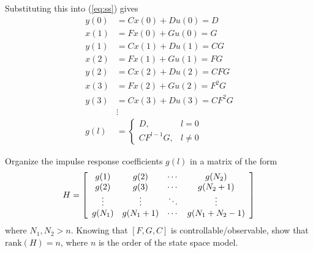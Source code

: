 \documentclass{report} %
\begin{document}
\begin{spacing}{1.1}
\begin{homeworkProblem}
\begin{homeworkSection}{1.1}
{Substituting this into (\ref{eq:ss}) gives
\begin{align*}
y(0) &= Cx(0) + Du(0) = D \\
x(1) &= Fx(0) + Gu(0) = G \\
y(1) &= Cx(1) + Du(1) = CG \\
x(2) &= Fx(1) + Gu(1) = FG \\
y(2) &= Cx(2) + Du(2) = CFG \\
x(3) &= Fx(2) + Gu(2) = F^2G \\
y(3) &= Cx(3) + Du(3) = CF^2G \\
&\vdots \\
g(l) &= \begin{cases} D, & l=0 \\ CF^{l-1}G, & l\neq 0 \end{cases}
\end{align*}
}
\end{homeworkSection}

\begin{homeworkSection}{1.2}
Organize the impulse response coefficients $g(l)$ in a matrix of the form
\begin{align*}
H =
\left[\begin{array}{c c c c}
g(1) & g(2) & \cdots & g(N_2) \\
g(2) & g(3) & \cdots & g(N_2+1) \\
\vdots & \vdots & \ddots & \vdots \\
g(N_1) & g(N_1+1) & \cdots & g(N_1+N_2-1)
\end{array}\right]
\end{align*}
where $N_1,N_2>n$. Knowing that $[F,G,C]$ is controllable/observable, show that $\text{rank}(H)=n$, where $n$ is the order of the state space model.
\newline
{}
\end{homeworkSection}
\end{homeworkProblem}
\end{spacing}
\end{document}
